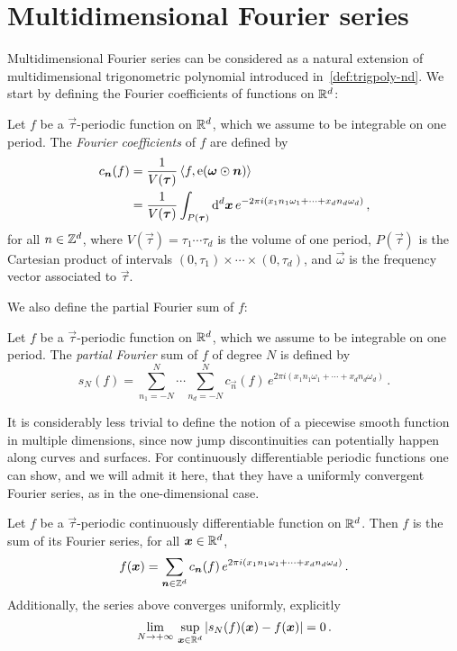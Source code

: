 \section{Multidimensional Fourier series}
Multidimensional Fourier series can be considered as a natural extension of
multidimensional trigonometric polynomial introduced in~\cref{def:trigpoly-nd}. We start
by defining the Fourier coefficients of functions on $\mathbb{R}^d$:
\begin{definition}
  Let $f$ be a $\vec{\tau}$-periodic function on $\mathbb{R}^d$, which we assume to be integrable
  on one period. The \emph{Fourier coefficients} of $f$ are defined by
  \begin{align}
    c_{\bm{n}}(f)&=\frac{1}{V(\bm{\tau})}\braket{f,\operatorname{e}(\bm{\omega}\odot\bm{n})}\notag\\
    &=\frac{1}{V(\bm{\tau})}
    \int_{P(\bm{\tau})}\mathrm{d}^d\bm{x}\,e^{-2\pi i(x_1n_1\omega_1+\cdots+x_dn_d\omega_d)}\,,
  \end{align}
  for all $n\in\mathbb{Z}^d$, where $V(\vec{\tau})=\tau_1\cdots\tau_d$ is the volume of one
  period, $P(\vec{\tau})$ is the Cartesian product of intervals
  $(0,\tau_1)\times\cdots\times(0,\tau_d)$, and $\vec{\omega}$ is the frequency vector
  associated to $\vec{\tau}$.
\end{definition}
We also define the partial Fourier sum of $f$:
\begin{definition}
  Let $f$ be a $\vec{\tau}$-periodic function on $\mathbb{R}^d$, which we assume to be integrable
  on one period. The \emph{partial Fourier} sum of $f$ of degree $N$ is defined by
  \begin{equation}
    s_N(f)=\sum_{n_1=-N}^{N}\cdots\sum_{n_d=-N}^{N}c_{\vec{n}}(f)\,
    e^{2\pi i(x_1n_1\omega_1+\cdots+x_dn_d\omega_d)}\,.
  \end{equation}
\end{definition}
It is considerably less trivial to define the notion of a piecewise smooth function in
multiple dimensions, since now jump discontinuities can potentially happen along curves
and surfaces. For continuously differentiable periodic functions one can show, and we will
admit it here, that they have a uniformly convergent Fourier series, as in the
one-dimensional case.
\begin{theorem}
  Let $f$ be a $\vec{\tau}$-periodic continuously differentiable function on $\mathbb{R}^d$. Then
  $f$ is the sum of its Fourier series, \ie for all $\bm{x}\in\mathbb{R}^d$,
  \begin{equation}
    f(\bm{x})=\sum_{\bm{n}\in\mathbb{Z}^d}c_{\bm{n}}(f)\,
    e^{2\pi i(x_1n_1\omega_1+\cdots+x_dn_d\omega_d)}\,.
  \end{equation}
  Additionally, the series above converges uniformly, explicitly
  \begin{equation}
    \lim_{N\to+\infty}\,\sup_{\bm{x}\in\mathbb{R}^d}|s_N(f)(\bm{x})-f(\bm{x})|=0\,.
  \end{equation}
\end{theorem}
